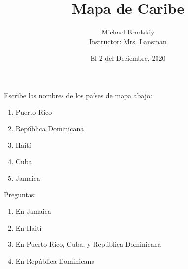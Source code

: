 \documentclass[12pt]{article}
\title{Mapa de Caribe}
\date{El 2 del Deciembre, 2020}
\author{Michael Brodskiy\\ \small Instructor: Mrs. Lansman}
\begin{document}
\maketitle

\flushleft Escribe los nombres de los pa\'ises de mapa abajo:

\begin{enumerate}

  \item Puerto Rico
    
  \item Rep\'ublica Dominicana

  \item Hait\'i

  \item Cuba

  \item Jamaica

\end{enumerate}

\flushleft Preguntas:

\begin{enumerate}

  \item En Jamaica

  \item En Hait\'i

  \item En Puerto Rico, Cuba, y Rep\'ublica Dominicana

  \item En Rep\'ublica Dominicana

\end{enumerate}
\end{document}
